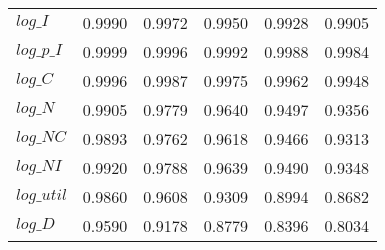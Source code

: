 \begin{center}
\begin{longtable}{lccccc}
$log\_I     $	 & 	    0.9990	 & 	    0.9972	 & 	    0.9950	 & 	    0.9928	 & 	    0.9905 \\ 
$log\_p\_I  $	 & 	    0.9999	 & 	    0.9996	 & 	    0.9992	 & 	    0.9988	 & 	    0.9984 \\ 
$log\_C     $	 & 	    0.9996	 & 	    0.9987	 & 	    0.9975	 & 	    0.9962	 & 	    0.9948 \\ 
$log\_N     $	 & 	    0.9905	 & 	    0.9779	 & 	    0.9640	 & 	    0.9497	 & 	    0.9356 \\ 
$log\_NC    $	 & 	    0.9893	 & 	    0.9762	 & 	    0.9618	 & 	    0.9466	 & 	    0.9313 \\ 
$log\_NI    $	 & 	    0.9920	 & 	    0.9788	 & 	    0.9639	 & 	    0.9490	 & 	    0.9348 \\ 
$log\_util  $	 & 	    0.9860	 & 	    0.9608	 & 	    0.9309	 & 	    0.8994	 & 	    0.8682 \\ 
$log\_D     $	 & 	    0.9590	 & 	    0.9178	 & 	    0.8779	 & 	    0.8396	 & 	    0.8034 \\ 
\end{longtable}
 \end{center}
